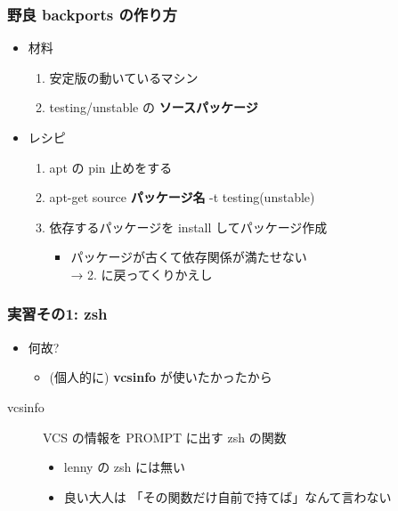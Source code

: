 \documentclass[cjk,dvipdfmx,12pt,%
hyperref={bookmarks=true,bookmarksnumbered=true,bookmarksopen=false,%
colorlinks=false,%
pdftitle={野良ビルドから始めるパッケージ作成},%
pdfauthor={佐々木洋平},%
pdfsubject={第37回関西Debian勉強会 at OSC 2010 Kansai$@$kyoto},%
}]{beamer}
\begin{document}
\begin{frame}[fragile]
\frametitle{野良 backports の作り方}


\begin{itemize}
\item 材料

\begin{enumerate}
\item 安定版の動いているマシン
\item testing/unstable の \textbf{ソースパッケージ}
\end{enumerate}

\item レシピ

\begin{enumerate}
\item apt の pin 止めをする
\item apt-get source \textbf{パッケージ名} -t testing(unstable)
\item 依存するパッケージを install してパッケージ作成

\begin{itemize}
\item パッケージが古くて依存関係が満たせない\\
→ 2. に戻ってくりかえし
\end{itemize}
\end{enumerate}
\end{itemize}


\end{frame}





\begin{frame}[fragile]
\frametitle{実習その1: zsh}

\begin{itemize}
\item 何故?

\begin{itemize}
\item (個人的に) \textbf{vcs\textunderscore{}info} が使いたかったから
\end{itemize}
\end{itemize}

\begin{description}
\item[vcs\textunderscore{}info] \mbox{}

VCS の情報を PROMPT に出す zsh の関数

\begin{itemize}
\item lenny の zsh には無い
\item 良い大人は
「その関数だけ自前で持てば」なんて言わない
\end{itemize}
\end{description}


\end{frame}
\end{document}

